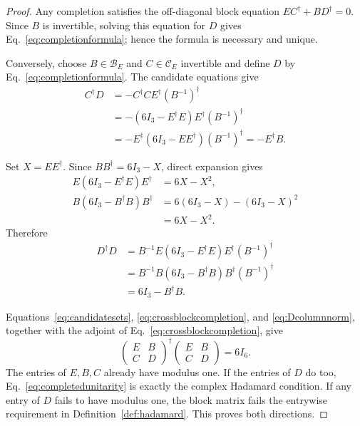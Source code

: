 \documentclass[aps,prx,reprint,nofootinbib,twoside,superscriptaddress,longbibliography,floatfix]{revtex4-2}
\theoremstyle{definition}
\newcommand{\C}{\mathbb C}
\begin{document}
\begin{proof}
Any completion satisfies the off-diagonal block equation $EC^{\dagger}+BD^{\dagger}=0$.  Since $B$ is invertible, solving this equation for $D$ gives Eq.~\eqref{eq:completionformula}; hence the formula is necessary and unique.

Conversely, choose $B\in\mathcal B_E$ and $C\in\mathcal C_E$ invertible and define $D$ by Eq.~\eqref{eq:completionformula}.  The candidate equations give
\begin{equation}
\begin{aligned}
C^{\dagger}D
&=-C^{\dagger}CE^{\dagger}(B^{-1})^{\dagger}\\
&=-(6I_3-E^{\dagger}E)E^{\dagger}(B^{-1})^{\dagger}\\
&=-E^{\dagger}(6I_3-EE^{\dagger})(B^{-1})^{\dagger}
=-E^{\dagger}B.
\end{aligned}
\label{eq:crossblockcompletion}
\end{equation}

Set $X=EE^{\dagger}$.  Since $BB^{\dagger}=6I_3-X$, direct expansion gives
\begin{equation}
\begin{aligned}
E(6I_3-E^{\dagger}E)E^{\dagger}
&=6X-X^2,\\
B(6I_3-B^{\dagger}B)B^{\dagger}
&=6(6I_3-X)-(6I_3-X)^2\\
&=6X-X^2.
\end{aligned}
\label{eq:completionidentity}
\end{equation}
Therefore
\begin{equation}
\begin{aligned}
D^{\dagger}D
&=B^{-1}E(6I_3-E^{\dagger}E)E^{\dagger}(B^{-1})^{\dagger}\\
&=B^{-1}B(6I_3-B^{\dagger}B)B^{\dagger}(B^{-1})^{\dagger}\\
&=6I_3-B^{\dagger}B.
\end{aligned}
\label{eq:Dcolumnnorm}
\end{equation}

Equations~\eqref{eq:candidatesets}, \eqref{eq:crossblockcompletion}, and \eqref{eq:Dcolumnnorm}, together with the adjoint of Eq.~\eqref{eq:crossblockcompletion}, give
\begin{equation}
\begin{pmatrix}E&B\\C&D\end{pmatrix}^{\!\dagger}
\begin{pmatrix}E&B\\C&D\end{pmatrix}=6I_6.
\label{eq:completedunitarity}
\end{equation}
The entries of $E,B,C$ already have modulus one.  If the entries of $D$ do too, Eq.~\eqref{eq:completedunitarity} is exactly the complex Hadamard condition.  If any entry of $D$ fails to have modulus one, the block matrix fails the entrywise requirement in Definition~\ref{def:hadamard}.  This proves both directions.

\end{proof}
\end{document}
